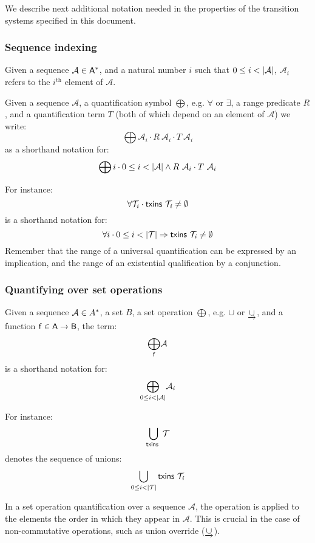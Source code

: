 We describe next additional notation needed in the properties of the transition
systems specified in this document.

\subsubsection{Sequence indexing}
\label{sec:seq-indexing}

Given a sequence $\mathcal{A} \in \mathsf{A}^{*}$, and a natural number $i$
such that $0 \leq i < \left| \mathcal{A} \right|$, $\mathcal{A}_i$ refers to the
$i^{\text{th}}$ element of $\mathcal{A}$.


Given a sequence $\mathcal{A}$, a quantification symbol $\bigoplus$, e.g.
$\forall$ or $\exists$, a range predicate $R$, and a quantification term $T$
(both of which depend on an element of $\mathcal{A}$) we write:
%
$$
\bigoplus \mathcal{A}_i \cdot R~\mathcal{A}_i \cdot T~\mathcal{A}_i
$$
%
as a shorthand notation for:
%
$$
\bigoplus i \cdot 0 \leq i < \left| \mathcal{A} \right| \wedge R~\mathcal{A}_i \cdot T~\mathcal{A}_i
$$

For instance:
%
$$
\forall \mathcal{T}_i \cdot \mathsf{txins}~ \mathit{\mathcal{T}_i} \neq \emptyset
$$
is a shorthand notation for:
$$
\forall i \cdot 0 \leq i < \left| \mathcal{T} \right| \Rightarrow \mathsf{txins}~ \mathit{\mathcal{T}_i} \neq \emptyset
$$
Remember that the range of a universal quantification can be expressed by an
implication, and the range of an existential qualification by a conjunction.

\subsubsection{Quantifying over set operations}
\label{sec:quantifying-over-set-operators}

Given a sequence $\mathcal{A} \in A^{*}$, a set $B$, a set operation
$\bigoplus$, e.g. $\cup$ or $\mathbin{\underrightarrow\cup}$, and a function
$\mathsf{f} \in \mathsf{A} \to \mathsf{B}$, the term:
%
$$
\underset{\mathsf{f}}{\bigoplus} \mathcal{A}
$$
is a shorthand notation for:
%
$$
\underset{0 \leq i < \left| \mathcal{A} \right|}{\bigoplus} \mathcal{A}_i
$$

For instance:
$$
\bigcup_{\mathsf{txins}~ \mathit{}} \mathcal{T}
$$
denotes the sequence of unions:
$$
\bigcup_{0 \leq i < \left| \mathcal{T} \right|} \mathsf{txins}~ \mathit{\mathcal{T}_i}
$$

In a set operation quantification over a sequence $\mathcal{A}$, the operation
is applied to the elements the order in which they appear in $\mathcal{A}$.
This is crucial in the case of non-commutative operations, such as union
override ($\mathbin{\underrightarrow\cup}$).

